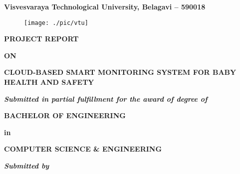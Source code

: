 \documentclass[12pt,a4paper]{report}
\begin{document}
\pagestyle{empty}
\begin{center}

{\large \textbf{Visvesvaraya Technological University, Belagavi – 590018}}
\begin{figure}[hbtp]
\centering
\texttt{[image: ./pic/vtu]}
\end{figure}

\textbf{PROJECT REPORT}
\par
\textbf{ON}
\par
\vspace{6pt}
{\Large \textbf{CLOUD-BASED SMART MONITORING SYSTEM
FOR BABY HEALTH AND SAFETY}}
\par
\vspace{12pt}
\par
\textit{\textbf{Submitted in partial fulfillment for the award of degree of }}
\par
\vspace{12pt}
\large \textbf{BACHELOR OF ENGINEERING }
\par
\textbf{in}
\par
\large \textbf{COMPUTER SCIENCE \& ENGINEERING}
\par
\vspace{12pt}
\textit{\textbf{Submitted by}}
\vspace{8pt}


\end{center}
\end{document}
